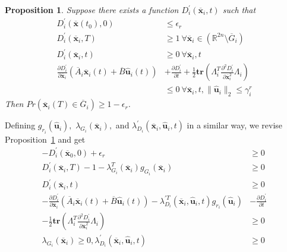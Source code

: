 \documentclass[journal]{IEEEtran}
\newtheorem{proposition}{Proposition}
\begin{document}
\begin{proposition}
\label{prop:barrier-reachability}
Suppose there exists a function $D_i^{'}(\overline{\mathbf{x}}_i, t)$ such that
\begin{align}
\label{eq:barrier-reachability1}
D_i^{'}(\overline{\mathbf{x}}(t_0),0) &\leq \epsilon_r \\
\label{eq:barrier-reachability2}
D_i^{'}(\overline{\mathbf{x}}_i,T) &\geq 1 \ \forall \overline{\mathbf{x}}_i \in (\mathbb{R}^{2n} \setminus \overline{G}_i) \\
\label{eq:barrier-reachability3}
D_i^{'}(\overline{\mathbf{x}}_i,t) &\geq 0 \ \forall \overline{\mathbf{x}}_i, t \\
\frac{\partial D_i^{'}}{\partial \overline{\mathbf{x}}_i}(\overline{A}_i\overline{\mathbf{x}}_i(t) + \overline{B}\hat{\mathbf{u}}_i(t)) &+ \frac{\partial D_i^{'}}{\partial t} + \frac{1}{2}\mathbf{tr}(\Lambda_i^{T}\frac{\partial^{2}D_i^{'}}{\partial \overline{\mathbf{x}}_i^{2}}\Lambda_i)\nonumber\\
\label{eq:barrier-reachability4}
&\leq 0 \ \forall \overline{\mathbf{x}}_i,t, \|\hat{\mathbf{u}}_i\|_{2} \leq \gamma_i^{r}
\end{align}
Then $Pr\left({\overline{\mathbf{x}}_i(T) \in \overline{G}_i}\right) \geq 1-\epsilon_r$.
\end{proposition}

Defining $g_{r_i}(\hat{\mathbf{u}}_i),$ $\lambda_{G_i}(\overline{\mathbf{x}}_i),$ and $\lambda_{D_i}^{\prime}(\overline{\mathbf{x}}_i, \hat{\mathbf{u}}_i, t)$ in a similar way, we revise Proposition~\ref{prop:barrier-reachability} and get
\begin{align}
\label{eq:barrier-reachability-sos1}
-D_i^{\prime}(\overline{\mathbf{x}}_{0}, 0) + \epsilon_r &\geq 0 \\
\label{eq:barrier-reachability-sos2}
D_i^{\prime}(\overline{\mathbf{x}}_i,T) - 1 - \lambda_{G_i}^{T}(\overline{\mathbf{x}}_i)g_{G_i}(\overline{\mathbf{x}}_i) &\geq 0 \\
\label{eq:barrier-reachability-sos3}
D_i^{\prime}(\overline{\mathbf{x}}_i,t) &\geq 0 \\
-\frac{\partial D_i^{'}}{\partial \overline{\mathbf{x}}_i}(\overline{A}_i\overline{\mathbf{x}}_i(t) + \overline{B}\hat{\mathbf{u}}_i(t)) - \lambda_{D_i}^{\prime T}(\overline{\mathbf{x}}_i, \hat{\mathbf{u}}_i, t)g_{r_i}(\hat{\mathbf{u}}_i) &- \frac{\partial D_i^{'}}{\partial t}
\nonumber \\
\label{eq:barrier-reachability-sos4}
- \frac{1}{2}\mathbf{tr}\left(\Lambda_i^{T}\frac{\partial^{2}D_i^{\prime}}{\partial \overline{\mathbf{x}}_i^{2}}\Lambda_i\right) &\geq 0 \\
\label{eq:barrier-reachability-sos5}
\lambda_{G_i}(\overline{\mathbf{x}}_i) \geq 0, \lambda_{D_i}^{\prime}(\overline{\mathbf{x}}_i,\hat{\mathbf{u}}_i, t) &\geq 0 
\end{align}
\end{document}
